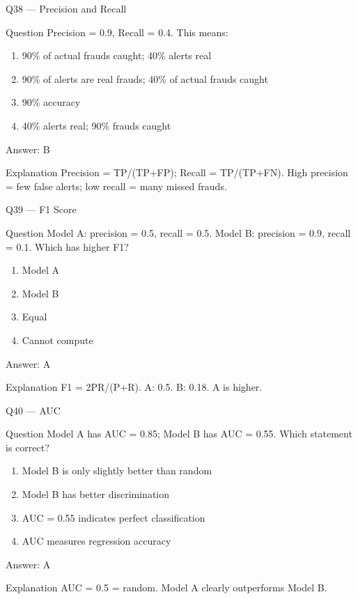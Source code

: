 \documentclass[aspectratio=169,8pt]{beamer}
\begin{document}
	\begin{frame}{Q38 --- Precision and Recall}
		\begin{block}{Question}
			Precision = 0.9, Recall = 0.4. This means:
		\end{block}
		\begin{enumerate}
			\item 90\% of actual frauds caught; 40\% alerts real
			\item 90\% of alerts are real frauds; 40\% of actual frauds caught
			\item 90\% accuracy
			\item 40\% alerts real; 90\% frauds caught
		\end{enumerate}
		\begin{exampleblock}{Answer: B}\end{exampleblock}
		\begin{block}{Explanation}
			Precision = TP/(TP+FP); Recall = TP/(TP+FN). High precision = few false alerts; low recall = many missed frauds.
		\end{block}
	\end{frame}
	
	\begin{frame}{Q39 --- F1 Score}
		\begin{block}{Question}
			Model A: precision = 0.5, recall = 0.5. Model B: precision = 0.9, recall = 0.1. Which has higher F1?
		\end{block}
		\begin{enumerate}
			\item Model A
			\item Model B
			\item Equal
			\item Cannot compute
		\end{enumerate}
		\begin{exampleblock}{Answer: A}\end{exampleblock}
		\begin{block}{Explanation}
			F1 = 2PR/(P+R). A: 0.5. B: 0.18. A is higher.
		\end{block}
	\end{frame}
	
	\begin{frame}{Q40 --- AUC}
		\begin{block}{Question}
			Model A has AUC = 0.85; Model B has AUC = 0.55. Which statement is correct?
		\end{block}
		\begin{enumerate}
			\item Model B is only slightly better than random
			\item Model B has better discrimination
			\item AUC = 0.55 indicates perfect classification
			\item AUC measures regression accuracy
		\end{enumerate}
		\begin{exampleblock}{Answer: A}\end{exampleblock}
		\begin{block}{Explanation}
			AUC = 0.5 = random. Model A clearly outperforms Model B.
		\end{block}
	\end{frame}
	
\end{document}
